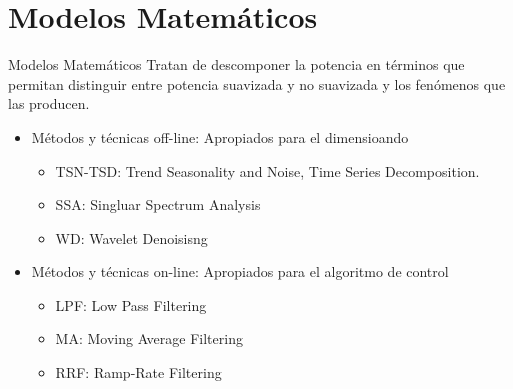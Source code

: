 \section[Modelos Matemáticos]{Modelos Matemáticos}

%
%
%
%
\begin{frame}{Modelos Matemáticos}
Tratan de descomponer la potencia en términos que permitan distinguir entre potencia suavizada y no suavizada y los fenómenos que las producen. \\[2ex]
\begin{itemize}
    \item Métodos y técnicas off-line: Apropiados para el dimensioando \\[1ex]
    \begin{itemize}
        \item TSN-TSD: Trend Seasonality and Noise, Time Series Decomposition.\\[1ex]
        \item SSA: Singluar Spectrum Analysis\\[1ex]
        \item WD: Wavelet Denoisisng\\[2ex]
    \end{itemize}
    \item Métodos y técnicas on-line: Apropiados para el algoritmo de control\\[1ex]
    \begin{itemize}
        \item LPF: Low Pass Filtering \\[1ex]
        \item MA: Moving Average Filtering \\[1ex]
        \item RRF: Ramp-Rate Filtering \\[2ex]
    \end{itemize}{}
\end{itemize}
\end{frame}
%
%
%
